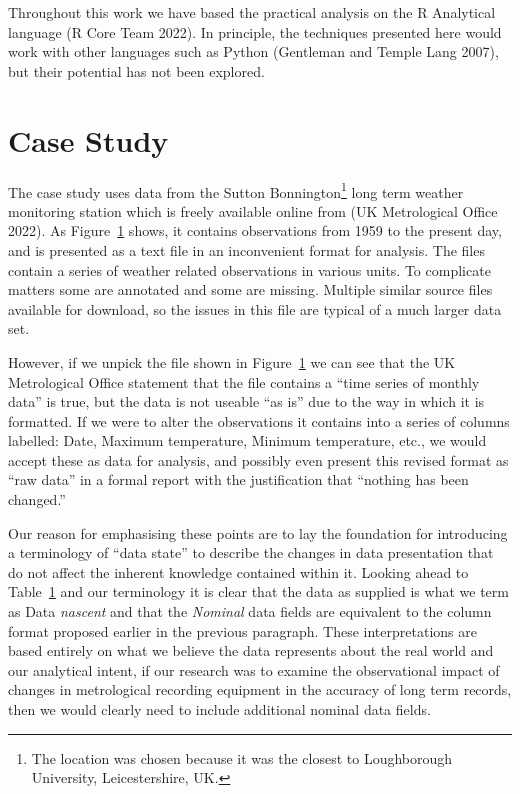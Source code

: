 \documentclass[
]{article}
\begin{document}
Throughout this work we have based the practical analysis on the R
Analytical language (R Core Team 2022). In principle, the techniques
presented here would work with other languages such as Python (Gentleman
and Temple Lang 2007), but their potential has not been explored.

\hypertarget{sec:case-study}{%
\section{Case Study}\label{sec:case-study}}

The case study uses data from the Sutton Bonnington\footnote{The
  location was chosen because it was the closest to Loughborough
  University, Leicestershire, UK.} long term weather monitoring station
which is freely available online from (UK Metrological Office 2022). As
Figure~\protect\hyperlink{fig:suttonbonningtondata}{1} shows, it
contains observations from 1959 to the present day, and is presented as
a text file in an inconvenient format for analysis. The files contain a
series of weather related observations in various units. To complicate
matters some are annotated and some are missing. Multiple similar source
files available for download, so the issues in this file are typical of
a much larger data set.

However, if we unpick the file shown in
Figure~\protect\hyperlink{fig:suttonbonningtondata}{1} we can see that
the UK Metrological Office statement that the file contains a ``time
series of monthly data'' is true, but the data is not useable ``as is''
due to the way in which it is formatted. If we were to alter the
observations it contains into a series of columns labelled: Date,
Maximum temperature, Minimum temperature, etc., we would accept these as
data for analysis, and possibly even present this revised format as
``raw data'' in a formal report with the justification that ``nothing
has been changed.''

Our reason for emphasising these points are to lay the foundation for
introducing a terminology of ``data state'' to describe the changes in
data presentation that do not affect the inherent knowledge contained
within it. Looking ahead to
Table~\protect\hyperlink{fig_terminology_introduction}{1} and our
terminology it is clear that the data as supplied is what we term as
Data \emph{nascent} and that the \emph{Nominal} data fields are
equivalent to the column format proposed earlier in the previous
paragraph. These interpretations are based entirely on what we believe
the data represents about the real world and our analytical intent, if
our research was to examine the observational impact of changes in
metrological recording equipment in the accuracy of long term records,
then we would clearly need to include additional nominal data fields.
\end{document}
